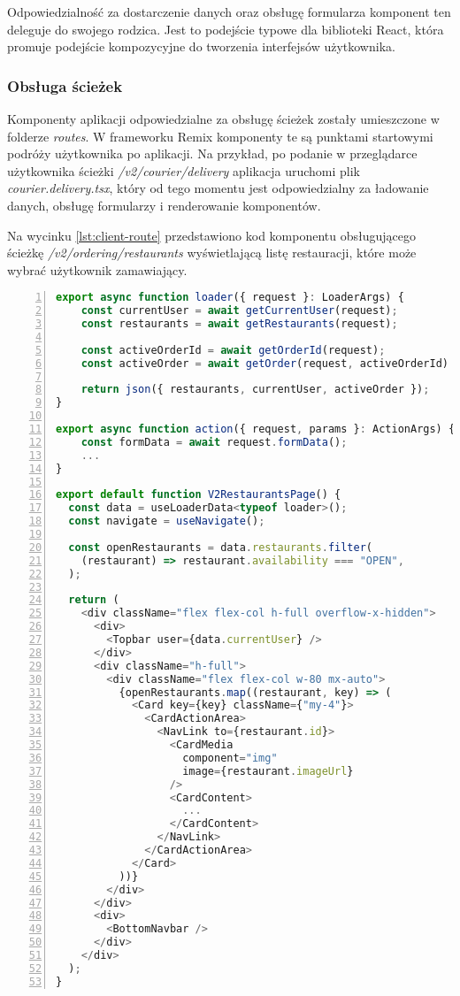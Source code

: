 Odpowiedzialność za dostarczenie danych oraz obsługę formularza komponent ten deleguje do swojego rodzica. Jest to podejście typowe dla biblioteki React, która promuje podejście kompozycyjne do tworzenia interfejsów użytkownika.

\subsubsection{Obsługa ścieżek}

Komponenty aplikacji odpowiedzialne za obsługę ścieżek zostały umieszczone w folderze \textit{routes}. W frameworku Remix komponenty te są punktami startowymi podróży użytkownika po aplikacji. Na przykład, po podanie w przeglądarce użytkownika ścieżki \textit{/v2/courier/delivery} aplikacja uruchomi plik \textit{courier.delivery.tsx}, który od tego momentu jest odpowiedzialny za ładowanie danych, obsługę formularzy i renderowanie komponentów.

Na wycinku \ref{lst:client-route} przedstawiono kod komponentu obsługującego ścieżkę \textit{/v2/ordering/restaurants} wyświetlającą listę restauracji, które może wybrać użytkownik zamawiający.

\begin{lstlisting}[caption={Kod ścieżki wyświetlającej listę dostępnych restauracji - \textit{/v2/ordering/restaurants}},label={lst:client-route},captionpos=b,language=JavaScript,numbers=left,showstringspaces=false]
export async function loader({ request }: LoaderArgs) {
    const currentUser = await getCurrentUser(request);
    const restaurants = await getRestaurants(request);
  
    const activeOrderId = await getOrderId(request);
    const activeOrder = await getOrder(request, activeOrderId)
  
    return json({ restaurants, currentUser, activeOrder });
}

export async function action({ request, params }: ActionArgs) {
    const formData = await request.formData();
    ...
}

export default function V2RestaurantsPage() {
  const data = useLoaderData<typeof loader>();
  const navigate = useNavigate();

  const openRestaurants = data.restaurants.filter(
    (restaurant) => restaurant.availability === "OPEN",
  );

  return (
    <div className="flex flex-col h-full overflow-x-hidden">
      <div>
        <Topbar user={data.currentUser} />
      </div>
      <div className="h-full">
        <div className="flex flex-col w-80 mx-auto">
          {openRestaurants.map((restaurant, key) => (
            <Card key={key} className={"my-4"}>
              <CardActionArea>
                <NavLink to={restaurant.id}>
                  <CardMedia
                    component="img"
                    image={restaurant.imageUrl}
                  />
                  <CardContent>
                    ...
                  </CardContent>
                </NavLink>
              </CardActionArea>
            </Card>
          ))}
        </div>
      </div>
      <div>
        <BottomNavbar />
      </div>
    </div>
  );
}      
\end{lstlisting}
      
